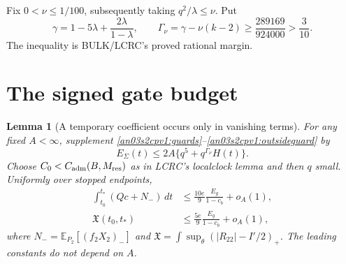 \documentclass[11pt]{article}
\newtheorem{lemma}[theorem]{Lemma}
\theoremstyle{remark}\newtheorem{remark}[theorem]{Remark}
\newcommand{\E}{\mathbb E}
\newcommand{\dd}{\,d}
\begin{document}
Fix $0<\nu\le1/100$, subsequently taking $q^2/\lambda\le\nu$.
Put
\begin{equation}
 \gamma=1-5\lambda+\frac{2\lambda}{1-\lambda},\qquad
 \Gamma_\nu=\gamma-\nu(k-2)
 \ge\frac{289169}{924000}>\frac3{10}.
 \label{an03s2cpv1:gamma}
\end{equation}
The inequality is BULK/LCRC's proved rational margin.

\section{The signed gate budget}
\begin{lemma}[A temporary coefficient occurs only in vanishing terms]
\label{an03s2cpv1:gate}
For any fixed $A<\infty$, supplement
\eqref{an03s2cpv1:guards}--\eqref{an03s2cpv1:outsideguard} by
\begin{equation}
 E_\Sigma(t)\le2A\{q^5+q^{\Gamma_\nu}H(t)\}.
 \label{an03s2cpv1:temporary}
\end{equation}
Choose $C_0<C_{\rm adm}(B,M_{\rm res})$ as in LCRC's localclock
lemma and then $q$ small. Uniformly over stopped endpoints,
\begin{align}
 \int_{t_0}^{t_*}(Qc+N_-)\dd t
 &\le \frac{10e}{9}\frac{E_g}{1-c_b}+o_A(1),
 \label{an03s2cpv1:gatebudget}\\
 \mathfrak X(t_0,t_*)&\le
 \frac{5e}{9}\frac{E_g}{1-c_b}+o_A(1),
 \label{an03s2cpv1:excess}
\end{align}
where $N_-=\E_{P_2}[(f_2X_2)_-]$ and
$\mathfrak X=\int\sup_\theta(|R_{22}|-I'/2)_+$.
The leading constants do not depend on $A$.
\end{lemma}
\end{document}
